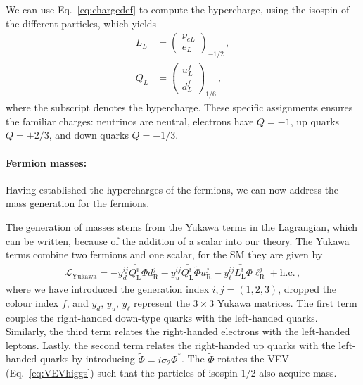 We can use Eq.~\eqref{eq:chargedef} to compute the hypercharge, using the isospin of the different particles, which yields 
\begin{align}
L_L &= \begin{pmatrix} \nu_{eL} \\ e_L \end{pmatrix}_{-1/2} \,,\\
Q_L &= \begin{pmatrix} u^f_L \\ d^f_L \end{pmatrix}_{1/6} \,,
\end{align}
where the subscript denotes the hypercharge. These specific assignments ensures the familiar charges: neutrinos are neutral, electrons have $Q=-1$, up quarks $Q=+2/3$, and down quarks $Q=-1/3$. 

\paragraph{Fermion masses: } Having established the hypercharges of the fermions, we can now address the mass generation for the fermions. 

The generation of masses stems from the Yukawa terms in the Lagrangian, which can be written, because of the addition of a scalar into our theory. The Yukawa terms combine two fermions and one scalar, for the SM they are given by
\begin{align}
    \mathcal{L}_{\mathrm{Yukawa}} = -y_d^{ij} \bar{Q_{\mathrm{L}}^i} \Phi d_{\mathrm{R}}^j - y_u^{ij} \bar{Q_{\mathrm{L}}^i} \tilde{\Phi} u_{\mathrm{R}}^j - y_\ell^{ij} \bar{L_{\mathrm{L}}^i} \Phi \ell_{\mathrm{R}}^j + \mathrm{h.c.}\,,\label{eq:LYukawa}
\end{align} 
where we have introduced the generation index $i,j=(1,2,3)$, dropped the colour index $f$, and $y_d,\,y_u,\,y_\ell$ represent the $3\times3$ Yukawa matrices. The first term couples the right-handed down-type quarks with the left-handed quarks. Similarly, the third term relates the right-handed electrons with the left-handed leptons. Lastly, the second term relates the right-handed up quarks with the left-handed quarks by introducing $\tilde\Phi=i\sigma_2\Phi^*$. The $\tilde\Phi$ rotates the VEV (Eq.~\eqref{eq:VEVhiggs}) such that the particles of isospin $1/2$ also acquire mass. 

